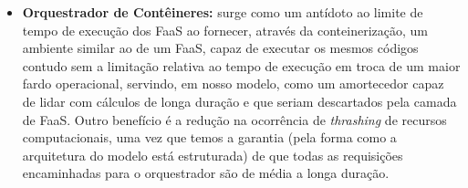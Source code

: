 \documentclass[english,brazilian]{UNISINOSmonografia} %
\begin{document}
\begin{itemize}
\begin{itemize}
		\item \textbf{Orquestrador de Contêineres:}
surge como um antídoto ao limite de tempo de execução dos FaaS ao fornecer, através da conteinerização, um ambiente similar ao de um FaaS, capaz de executar os mesmos códigos contudo sem a limitação relativa ao tempo de execução em troca de um maior fardo operacional, servindo, em nosso modelo, como um amortecedor capaz de lidar com cálculos de longa duração e que seriam descartados pela camada de FaaS. 
Outro benefício é a redução na ocorrência de \textit{thrashing} de recursos computacionais, uma vez que temos a garantia (pela forma como a arquitetura do modelo está estruturada) de que todas as requisições encaminhadas para o orquestrador são de média a longa duração.
		
	\end{itemize}
	
\end{itemize}
\end{document}
